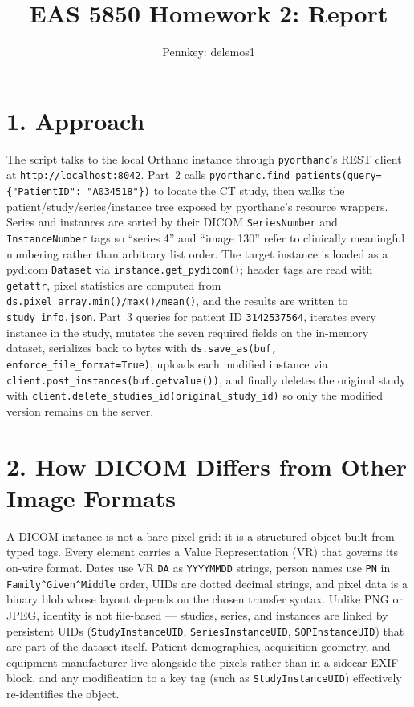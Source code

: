 \documentclass[11pt]{article}
\title{\vspace{-3em}EAS 5850 Homework 2: Report}
\author{Pennkey: delemos1}
\date{}
\begin{document}
\maketitle
\vspace{-2.5em}

\section*{1. Approach}
The script talks to the local Orthanc instance through \texttt{pyorthanc}'s REST client at \texttt{http://localhost:8042}. Part~2 calls \texttt{pyorthanc.find\_patients(query=\{"PatientID": "A034518"\})} to locate the CT study, then walks the patient/study/series/instance tree exposed by pyorthanc's resource wrappers. Series and instances are sorted by their DICOM \texttt{SeriesNumber} and \texttt{InstanceNumber} tags so ``series 4'' and ``image 130'' refer to clinically meaningful numbering rather than arbitrary list order. The target instance is loaded as a pydicom \texttt{Dataset} via \texttt{instance.get\_pydicom()}; header tags are read with \texttt{getattr}, pixel statistics are computed from \texttt{ds.pixel\_array.min()/max()/mean()}, and the results are written to \texttt{study\_info.json}. Part~3 queries for patient ID \texttt{3142537564}, iterates every instance in the study, mutates the seven required fields on the in-memory dataset, serializes back to bytes with \texttt{ds.save\_as(buf, enforce\_file\_format=True)}, uploads each modified instance via \texttt{client.post\_instances(buf.getvalue())}, and finally deletes the original study with \texttt{client.delete\_studies\_id(original\_study\_id)} so only the modified version remains on the server.

\section*{2. How DICOM Differs from Other Image Formats}
A DICOM instance is not a bare pixel grid: it is a structured object built from typed tags. Every element carries a Value Representation (VR) that governs its on-wire format. Dates use VR \texttt{DA} as \texttt{YYYYMMDD} strings, person names use \texttt{PN} in \texttt{Family\^{}Given\^{}Middle} order, UIDs are dotted decimal strings, and pixel data is a binary blob whose layout depends on the chosen transfer syntax. Unlike PNG or JPEG, identity is not file-based --- studies, series, and instances are linked by persistent UIDs (\texttt{StudyInstanceUID}, \texttt{SeriesInstanceUID}, \texttt{SOPInstanceUID}) that are part of the dataset itself. Patient demographics, acquisition geometry, and equipment manufacturer live alongside the pixels rather than in a sidecar EXIF block, and any modification to a key tag (such as \texttt{StudyInstanceUID}) effectively re-identifies the object.
\end{document}
